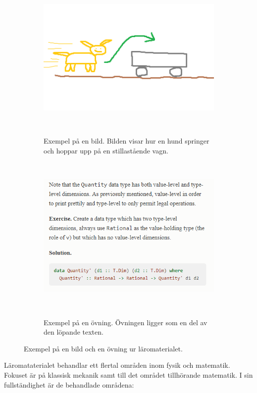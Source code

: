 \begin{draft}
\begin{figure}[tph]
    \centering
    \begin{subfigure}[t]{0.5\textwidth}
        \centering
        \includegraphics[width=0.9\linewidth]{figure/smakprov_bild_laromaterial.png}
        \caption{Exempel på en bild. Bilden visar hur en hund springer och
                 hoppar upp på en stillastående
                 vagn.}~\label{fig:smakprov_bild_laromaterial}
    \end{subfigure}%
    ~~~
    \begin{subfigure}[t]{0.5\textwidth}
        \centering
        \includegraphics[width=0.9\linewidth]{figure/smakprov_ovning.png}
        \caption{Exempel på en övning. Övningen ligger som en del av den
                 löpande texten.}~\label{fig:smakprov_ovning}
    \end{subfigure}
    \caption{Exempel på en bild och en övning ur läromaterialet.} 
\end{figure}

Läromataterialet behandlar ett flertal områden inom fysik och matematik.
Fokuset är på klassisk mekanik samt till det området tillhörande matematik. I
sin fullständighet är de behandlade områdena:


\end{draft}
